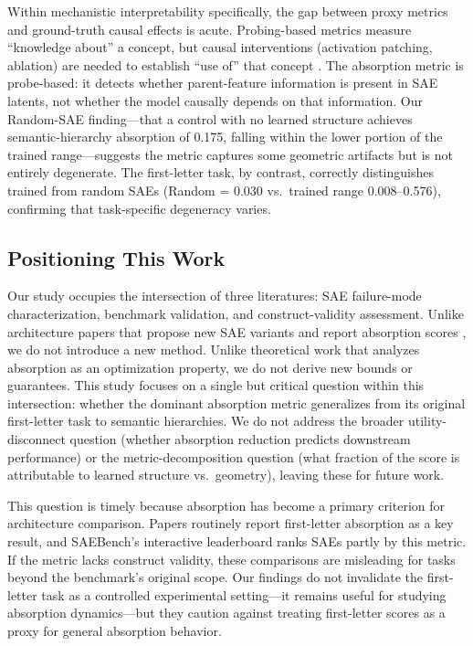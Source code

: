 \documentclass{article}
\begin{document}
Within mechanistic interpretability specifically, the gap between proxy metrics and ground-truth causal effects is acute. Probing-based metrics measure ``knowledge about'' a concept, but causal interventions (activation patching, ablation) are needed to establish ``use of'' that concept \citep{belinkov2022probing}. The absorption metric is probe-based: it detects whether parent-feature information is present in SAE latents, not whether the model causally depends on that information. Our Random-SAE finding---that a control with no learned structure achieves semantic-hierarchy absorption of 0.175, falling within the lower portion of the trained range---suggests the metric captures some geometric artifacts but is not entirely degenerate. The first-letter task, by contrast, correctly distinguishes trained from random SAEs (Random = 0.030 vs.~trained range 0.008--0.576), confirming that task-specific degeneracy varies.

\subsection{Positioning This Work}

Our study occupies the intersection of three literatures: SAE failure-mode characterization, benchmark validation, and construct-validity assessment. Unlike architecture papers that propose new SAE variants and report absorption scores \citep{bussmann2025matryoshka,korznikov2026ortsae}, we do not introduce a new method. Unlike theoretical work that analyzes absorption as an optimization property, we do not derive new bounds or guarantees. This study focuses on a single but critical question within this intersection: whether the dominant absorption metric generalizes from its original first-letter task to semantic hierarchies. We do not address the broader utility-disconnect question (whether absorption reduction predicts downstream performance) or the metric-decomposition question (what fraction of the score is attributable to learned structure vs.~geometry), leaving these for future work.

This question is timely because absorption has become a primary criterion for architecture comparison. Papers routinely report first-letter absorption as a key result, and SAEBench's interactive leaderboard ranks SAEs partly by this metric. If the metric lacks construct validity, these comparisons are misleading for tasks beyond the benchmark's original scope. Our findings do not invalidate the first-letter task as a controlled experimental setting---it remains useful for studying absorption dynamics---but they caution against treating first-letter scores as a proxy for general absorption behavior.
\end{document}
